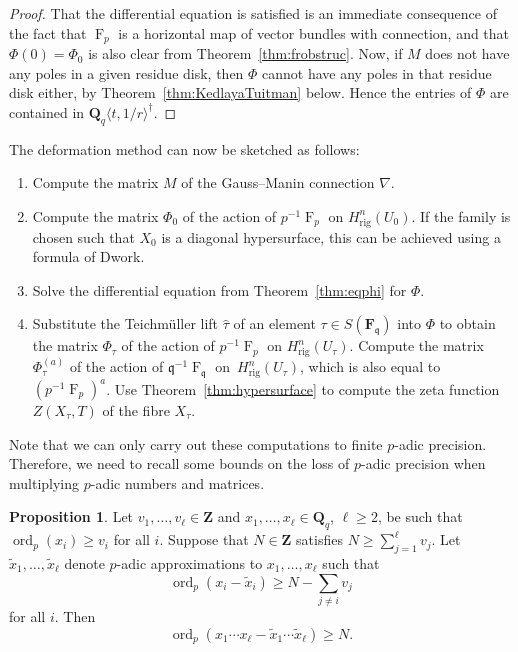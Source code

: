 \documentclass[a4paper,11pt]{article}
\numberwithin{equation}{section}
\newcommand{\ZZ}{\mathbf{Z}} %
\newcommand{\QQ}{\mathbf{Q}} %
\newcommand{\FF}{\mathbf{F}} %
\DeclareMathOperator{\ord}{ord}          %
\DeclareMathOperator{\Frob}{F}           %
\providecommand{\Hrig}{H_{\text{rig}}}  %
\theoremstyle{definition}
\newtheorem{prop}[thm]{Proposition}
\begin{document}
\begin{proof}
That the differential equation is satisfied is an immediate consequence of the 
fact that $\Frob_p$ is a horizontal map of vector bundles with connection, and 
that $\Phi(0)=\Phi_0$ is also clear from Theorem~\ref{thm:frobstruc}. Now, if 
$M$ does not have any poles in a given residue disk, then $\Phi$ cannot have 
any poles in that residue disk either, by Theorem~\ref{thm:KedlayaTuitman} 
below. Hence the entries of $\Phi$ are contained in 
$\QQ_q \langle t, 1/r \rangle^{\dag}$.
\end{proof}

The deformation method can now be sketched as follows:
\begin{enumerate}[\it Step 1.]
\item Compute the matrix $M$ of the Gauss--Manin connection $\nabla$.
\item Compute the matrix $\Phi_0$ of the action of $p^{-1}\Frob_p$ on 
      $\Hrig^n(U_0)$. If the family is chosen such that $X_0$ is a diagonal 
      hypersurface, this can be achieved using a formula of Dwork.
\item Solve the differential equation from Theorem~\ref{thm:eqphi} for $\Phi$.
\item Substitute the Teichm\"uller lift $\hat{\tau}$ of an element 
      $\tau \in S(\FF_{\mathfrak{q}})$ into $\Phi$ to obtain the 
      matrix $\Phi_{\tau}$ of the action of $p^{-1}\Frob_p$ on 
      $\Hrig^n(U_{\tau})$. Compute the matrix $\Phi_{\tau}^{(a)}$ 
      of the action of $\mathfrak{q}^{-1} \Frob_{\mathfrak{q}}$ 
      on~$\Hrig^n(U_{\tau})$, which is also equal to $(p^{-1}\Frob_p)^a$.
      Use Theorem~\ref{thm:hypersurface} to compute the zeta function 
      $Z(X_{\tau},T)$ of the fibre $X_{\tau}$.
\end{enumerate}


Note that we can only carry out these computations to finite $p$-adic 
precision. Therefore, we need to recall some bounds on the loss of $p$-adic 
precision when multiplying $p$-adic numbers and matrices. 

\begin{prop} \label{prop:productval}
Let $v_1,\dotsc,v_{\ell} \in \ZZ$ and $x_1, \dotsc, x_{\ell} \in \mathbf{Q}_q$,  
$\ell \geq 2$, be such that $\ord_p(x_i) \geq v_i$ for all $i$. Suppose that 
$N \in \ZZ$ satisfies $N \geq \sum_{j=1}^{\ell} v_j$. Let 
$\tilde{x}_1, \dotsc, \tilde{x}_{\ell}$ denote $p$-adic approximations to 
$x_1, \dotsc, x_{\ell}$ such that 
\[
\ord_p(x_i - \tilde{x}_i) \geq N - \sum_{j \neq i} v_j
\] 
for all $i$.  Then 
\begin{equation*}
\ord_p(x_1 \dotsm x_{\ell} - \tilde{x}_1 \dotsm \tilde{x}_{\ell}) \geq N.
\end{equation*}
\end{prop}
\end{document}

